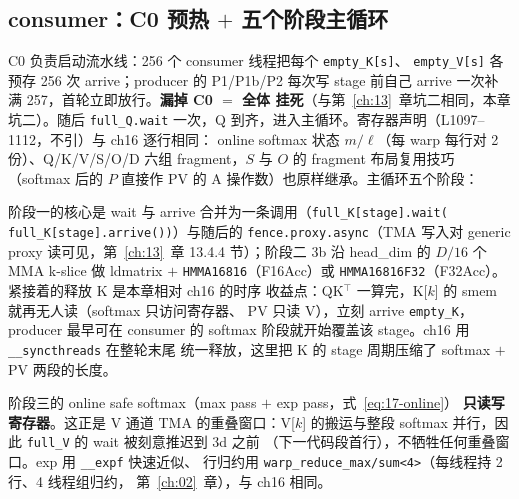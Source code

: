 \subsection{consumer：C0 预热 $+$ 五个阶段主循环}



C0 负责启动流水线：256 个 consumer 线程把每个 \texttt{empty\_K[s]}、
\texttt{empty\_V[s]} 各预存 256 次 arrive；producer 的 P1/P1b/P2 每次写
stage 前自己 arrive 一次补满 257，首轮立即放行。\textbf{漏掉 C0 $=$ 全体
挂死}（与第~\ref{ch:13}~章坑二相同，本章坑二）。随后 \texttt{full\_Q.wait}
一次，Q 到齐，进入主循环。寄存器声明（L1097--1112，不引）与 ch16 逐行相同：
online softmax 状态 $m/\ell$（每 warp 每行对 2 份）、Q/K/V/S/O/D 六组
fragment，$S$ 与 $O$ 的 fragment 布局复用技巧（softmax 后的 $P$ 直接作
PV 的 A 操作数）也原样继承。主循环五个阶段：





阶段一的核心是 wait 与 arrive 合并为一条调用（\texttt{full\_\allowbreak{}K[stage].\allowbreak{}wait\allowbreak{}(
full\_\allowbreak{}K[stage].\allowbreak{}arrive\allowbreak{}())}）与随后的 \texttt{fence.\allowbreak{}proxy.\allowbreak{}async}（TMA 写入对
generic proxy 读可见，第~\ref{ch:13}~章 13.4.4 节）；阶段二 3b 沿 head\_dim 的
$D/16$ 个 MMA k-slice 做 ldmatrix $+$ \texttt{HMMA16816}（F16Acc）或
\texttt{HMMA16816\allowbreak{}F32}（F32Acc）。紧接着的释放 K 是本章相对 ch16 的时序
收益点：QK$^\top$ 一算完，K[$k$] 的 smem 就再无人读（softmax 只访问寄存器、
PV 只读 V），立刻 arrive \texttt{empty\_K}，producer 最早可在 consumer 的
softmax 阶段就开始覆盖该 stage。ch16 用 \texttt{\_\allowbreak{}\_\allowbreak{}syncthreads} 在整轮末尾
统一释放，这里把 K 的 stage 周期压缩了 softmax $+$ PV 两段的长度。



阶段三的 online safe softmax（max pass $+$ exp pass，式~\ref{eq:17-online}）
\textbf{只读写寄存器}。这正是 V 通道 TMA 的重叠窗口：V[$k$] 的搬运与整段
softmax 并行，因此 \texttt{full\_V} 的 wait 被刻意推迟到 3d 之前
（下一代码段首行），不牺牲任何重叠窗口。exp 用 \texttt{\_\_expf} 快速近似、
行归约用 \texttt{warp\_\allowbreak{}reduce\_\allowbreak{}max/\allowbreak{}sum\allowbreak{}<4>}（每线程持 2 行、4 线程组归约，
第~\ref{ch:02}~章），与 ch16 相同。

